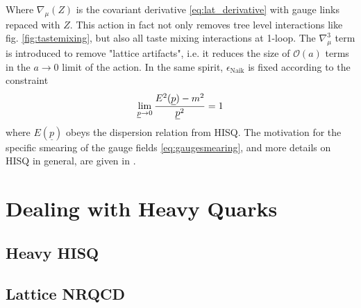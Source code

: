 Where $\nabla_{\mu}(Z)$ is the covariant derivative \eqref{eq:lat_derivative} with gauge links repaced with $Z$. This action in fact not only removes tree level interactions like fig. \ref{fig:tastemixing}, but also all taste mixing interactions at 1-loop. The $\nabla^3_{\mu}$ term is introduced to remove "lattice artifacts", i.e. it reduces the size of $\mathcal{O}(a)$ terms in the $a\to 0$ limit of the action. In the same spirit, $\epsilon_{\text{Naik}}$ is fixed according to the constraint
\begin{align}
	\lim_{\underline{p}\to 0} {E^2(\underline{p})-m^2\over \underline{p}^2} = 1
\end{align}
where $E(\underline{p})$ obeys the dispersion relation from HISQ. The motivation for the specific smearing of the gauge fields \eqref{eq:gaugesmearing}, and more details on HISQ in general, are given in \cite{Follana:2006rc}.

\section{Dealing with Heavy Quarks}

{}

\subsection{Heavy HISQ}

{}

\subsection{Lattice NRQCD}

{}
